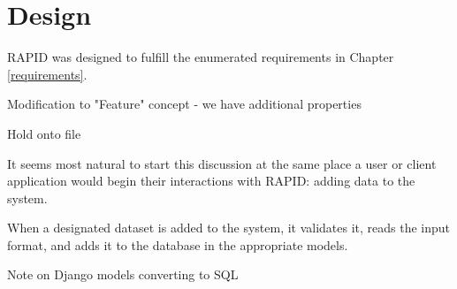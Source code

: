 \chapter{Design}
\label{design}

RAPID was designed to fulfill the enumerated requirements in Chapter \ref{requirements}.



Modification to "Feature" concept - we have additional properties

Hold onto file


It seems most natural to start this discussion at the same place a user or client application would begin their interactions with RAPID: adding data to the system.

When a designated dataset is added to the system, it validates it, reads the input format, and adds it to the database in the appropriate models.

Note on Django models converting to SQL